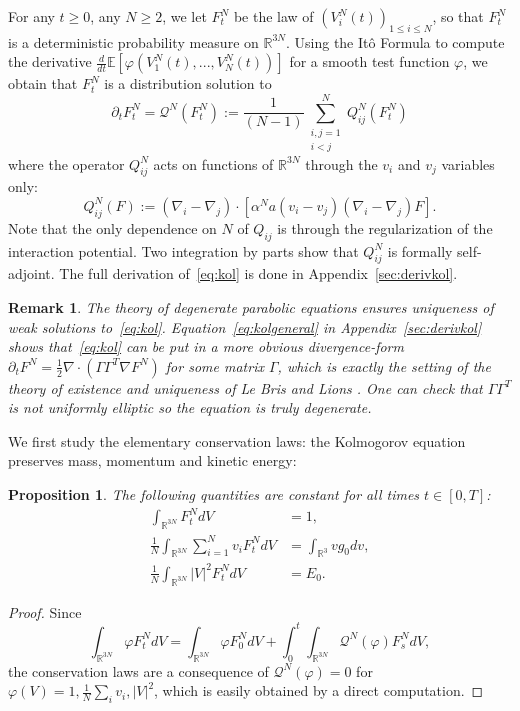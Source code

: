 \documentclass[11pt,a4paper]{article}
\theoremstyle{definition}
\theoremstyle{plain}
\newtheorem{prop}[defi]{Proposition}
\newtheorem{remark}[defi]{Remark}
\begin{document}
For any $t\geq 0$, any $N\geq 2$, we let $F^N_t$ be the law of $(V^N_i(t))_{1\leq i\leq N}$, so that $F^N_t$ is a deterministic probability measure on $\mathbb{R}^{3N}$.
Using the Itô Formula to compute the derivative $\frac{d}{dt} \mathbb{E}\left[\varphi(V^N_1(t),...,V^N_N(t))\right]$ for a smooth test function $\varphi$, we obtain that $F^N_t$ is a distribution solution to
\begin{equation}
\label{eq:kol}
    \partial_t F^N_t = \mathcal{Q}^N(F^N_t):= \frac{1}{(N-1)} \sum_{\substack{i, j = 1 \\ i< j}}^N Q^N_{ij}(F^N_t) 
\end{equation}
where the operator $Q^N_{ij}$ acts on functions of $\mathbb{R}^{3N}$ through the $v_i$ and $v_j$ variables only:
\begin{equation}
\label{eq:defQij}
    Q_{ij}^N(F):= (\nabla_i - \nabla_j) \cdot \left[ \alpha^Na(v_i - v_j) (\nabla_i - \nabla_j) F\right].
\end{equation}
Note that the only dependence on $N$ of $Q_{ij}$ is through the regularization of the interaction potential. Two integration by parts show that $Q^N_{ij}$ is formally self-adjoint. The full derivation of~\eqref{eq:kol} is done in Appendix~\ref{sec:derivkol}.

\begin{remark}
    The theory of degenerate parabolic equations ensures uniqueness of weak solutions to~\eqref{eq:kol}. Equation~\eqref{eq:kolgeneral} in Appendix~\ref{sec:derivkol} shows that~\eqref{eq:kol} can be put in a more obvious divergence-form $\partial_tF^N = \frac{1}{2}\nabla\cdot(\Gamma \Gamma^T\nabla F^N)$ for some matrix $\Gamma$, which is exactly the setting of the theory of existence and uniqueness of Le Bris and Lions \cite{LeBrisLions2008,LeBrisLions2019}. One can check that $\Gamma \Gamma^T$ is not uniformly elliptic so the equation is truly degenerate.
\end{remark}

We first study the elementary conservation laws: the Kolmogorov equation preserves mass, momentum and kinetic energy:
\begin{prop}
    \label{prop:kol_conservations}
    The following quantities are constant for all times $t\in[0,T]$:
    \begin{align*}
        \int_{\mathbb{R}^{3N}} F^N_tdV&=1,\\
        \frac{1}{N}\int_{\mathbb{R}^{3N}} \sum_{i=1}^N v_iF^N_tdV&=\int_{\mathbb{R}^{3}} v g_0dv, \\
        \frac{1}{N}\int_{\mathbb{R}^{3N}} \vert V\vert^2 F^N_tdV&=E_0.
    \end{align*}
\end{prop}
\begin{proof}

    Since
    $$\int_{\mathbb{R}^{3N}}\varphi F^N_t dV =\int_{\mathbb{R}^{3N}}\varphi F^N_0 dV+ \int_0^t \int_{\mathbb{R}^{3N}}\mathcal{Q}^N(\varphi)F^N_s dV,$$
    the conservation laws are a consequence of $\mathcal{Q}^N(\varphi)=0$ for $\varphi(V)=1,\frac{1}{N}\sum_i v_i, \vert V\vert^2$, which is easily obtained by a direct computation.
\end{proof}
\end{document}

